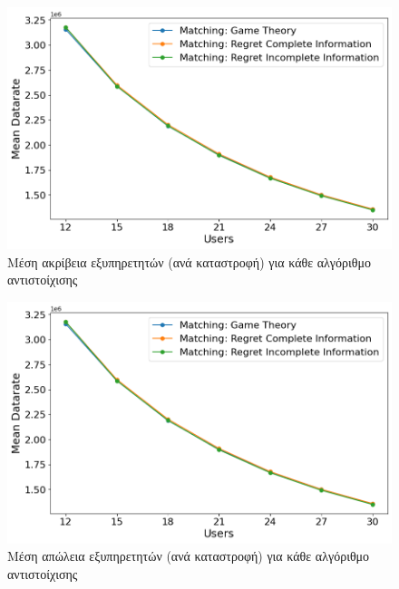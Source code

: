 \newpage

\begin{figure}[H]
    \centering
    \includegraphics[width=\textwidth]{figures/chapter4/Mean_Datarate_vs_Users.png}
    \caption{Μέση ακρίβεια εξυπηρετητών (ανά καταστροφή) για κάθε αλγόριθμο αντιστοίχισης}
    \label{fig50}
\end{figure}

\begin{figure}[H]
    \centering
    \includegraphics[width=\textwidth]{figures/chapter4/Mean_Datarate_vs_Users.png}
    \caption{Μέση απώλεια εξυπηρετητών (ανά καταστροφή) για κάθε αλγόριθμο αντιστοίχισης}
    \label{fig51}
\end{figure}

\newpage


